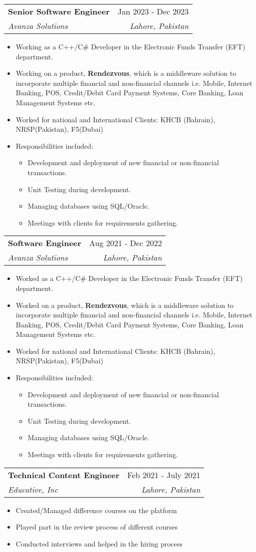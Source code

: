 \documentclass[letterpaper,11pt]{article}
\makeatletter
\newcommand{\resumeItem}[1]{
  \item\small{
    {#1 \vspace{-2pt}}
  }
}
\newcommand{\resumeSubheading}[4]{
  \vspace{-2pt}\item
    \begin{tabular*}{0.97\textwidth}[t]{l@{\extracolsep{\fill}}r}
      \textbf{#1} & #2 \\
      \textit{\small#3} & \textit{\small #4} \\
    \end{tabular*}\vspace{-7pt}
}
\newcommand{\resumeItemListStart}{\begin{itemize}}
\newcommand{\resumeItemListEnd}{\end{itemize}\vspace{-5pt}}
\makeatother
\begin{document}
    \resumeSubheading
      {Senior Software Engineer}{Jan 2023 - Dec 2023}
      {Avanza Solutions}{Lahore, Pakistan}
      \resumeItemListStart
        \resumeItem{Working as a C++/C\# Developer in the Electronic Funds Transfer (EFT) department.}
        \resumeItem{Working on a product, \textbf{Rendezvous}, which is a middleware solution to incorporate multiple financial and non-financial channels i.e. Mobile, Internet Banking, POS, Credit/Debit Card Payment Systems, Core Banking, Loan Management Systems etc.}
        \resumeItem{Worked for national and International Clients: KHCB (Bahrain), NRSP(Pakistan), F5(Dubai)}
        \resumeItem{Responsibilities included:
            \resumeItemListStart
        			\resumeItem{Development and deployment of new financial or non-financial transactions.}
        			\resumeItem{Unit Testing during development.}
        			\resumeItem{Managing databases using SQL/Oracle.}
        			\resumeItem{Meetings with clients for requirements gathering. \newline }
   			\resumeItemListEnd}
    \resumeItemListEnd
 
    \resumeSubheading
      {Software Engineer}{Aug 2021 - Dec 2022}
      {Avanza Solutions}{Lahore, Pakistan}
      \resumeItemListStart
        \resumeItem{Worked as a C++/C\# Developer in the Electronic Funds Transfer (EFT) department.}
        \resumeItem{Worked on a product, \textbf{Rendezvous}, which is a middleware solution to incorporate multiple 								financial and non-financial channels i.e. Mobile, Internet Banking, POS, Credit/Debit Card Payment Systems, Core Banking, Loan Management Systems etc.}
        \resumeItem{Worked for national and International Clients: KHCB (Bahrain), NRSP(Pakistan), F5(Dubai)}
        \resumeItem{Responsibilities included:
            \resumeItemListStart
        			\resumeItem{Development and deployment of new financial or non-financial transactions.}
        			\resumeItem{Unit Testing during development.}
        			\resumeItem{Managing databases using SQL/Oracle.}
        			\resumeItem{Meetings with clients for requirements gathering. \newline }
   			\resumeItemListEnd}
    \resumeItemListEnd

    \resumeSubheading
      {Technical Content Engineer}{Feb 2021 - July 2021}
      {Educative, Inc}{Lahore, Pakistan}
      \resumeItemListStart
        \resumeItem{Created/Managed difference courses on the platform}
        \resumeItem{Played part in the review process of different courses}
        \resumeItem{Conducted interviews and helped in the hiring process}
    \resumeItemListEnd
      
\end{document}
